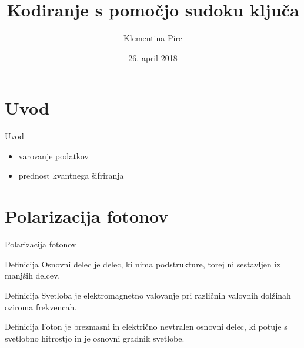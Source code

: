 \documentclass{beamer}
\title{Kodiranje s pomočjo sudoku ključa}
\author{Klementina Pirc}
\institute{Fakulteta za matematiko in fiziko \\ Oddelek za matematiko}
\date{26. april 2018}
\begin{document}

\begin{frame}
\titlepage
\end{frame}


\section{Uvod}


\begin{frame}{Uvod}
\begin{itemize}
\item varovanje podatkov
\item prednost kvantnega šifriranja
\end{itemize}
\end{frame}


\section{Polarizacija fotonov}


\begin{frame}{Polarizacija fotonov}

\begin{block}{Definicija}
Osnovni delec je delec, ki nima podstrukture, torej ni sestavljen iz manjših delcev.
\end{block}

\begin{block}{Definicija}
Svetloba je elektromagnetno valovanje pri različnih valovnih dolžinah oziroma frekvencah.
\end{block}

\begin{block}{Definicija}
Foton je brezmasni in električno nevtralen osnovni delec, ki potuje s svetlobno hitrostjo in je osnovni gradnik svetlobe.
\end{block} 

\end{frame}

\end{document}
